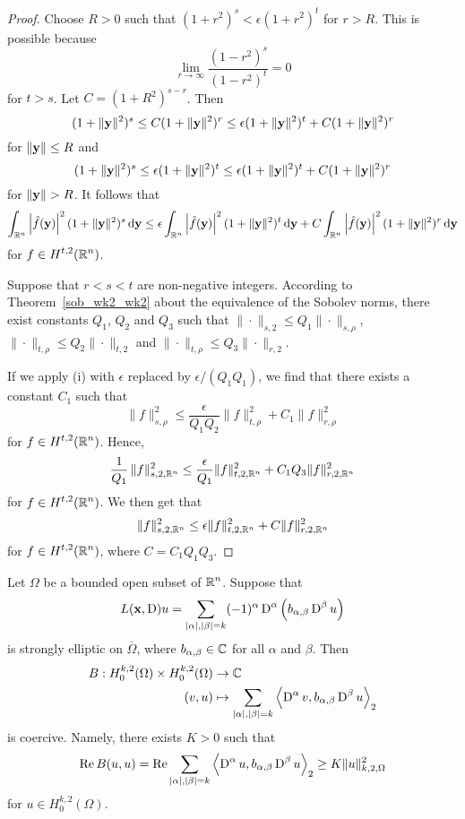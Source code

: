 \begin{proof}
 Choose $R>0$ such that $(1+r^2)^s < \epsilon (1+r^2)^t$ for $r> R$.
This is possible because
\[
\lim_{r\rightarrow \infty} \frac{(1-r^2)^s}{(1-r^2)^t} = 0
\]
for $t>s$.  Let $C= (1+R^2)^{s-r}$.  Then
\[
(1+\|\mathbf{y}\|^2)^s \leq C (1+\|\mathbf{y}\|^2)^r \leq
\epsilon (1+\|\mathbf{y}\|^2)^t + C (1+\|\mathbf{y}\|^2)^r
\]
for $\|\mathbf{y}\|\leq R$ and
\[
(1+\|\mathbf{y}\|^2)^s \leq \epsilon (1+\|\mathbf{y}\|^2)^t \leq
\epsilon (1+\|\mathbf{y}\|^2)^t + C (1+\|\mathbf{y}\|^2)^r
\]
for $\|\VEC{y}\|> R$.  It follows that
\[
\int_{\mathbb{R}^n} \left|\hat{f}(\mathbf{y})\right|^2 (1+\|\mathbf{y}\|^2)^s \,\mathrm{d}{\mathbf{y}}
\leq \epsilon \int_{\mathbb{R}^n} \left|\hat{f}(\mathbf{y})\right|^2
(1+\|\mathbf{y}\|^2)^t \,\mathrm{d}{\mathbf{y}}
+ C \int_{\mathbb{R}^n} \left|\hat{f}(\mathbf{y})\right|^2
(1+\|\mathbf{y}\|^2)^r \,\mathrm{d}{\mathbf{y}}
\]
for $\displaystyle f \in H^{t,2}(\mathbb{R}^n)$.

  Suppose that $r<s<t$ are non-negative integers.
According to Theorem~\ref{sob_wk2_wk2} about the equivalence of the
Sobolev norms, there exist constants $Q_1$, $Q_2$ and $Q_3$ such that
$\|\cdot\|_{s,2} \leq Q_1 \|\cdot\|_{s,\rho}$,
$\|\cdot\|_{t,\rho} \leq Q_2 \|\cdot\|_{t,2}$ and
$\|\cdot\|_{t,\rho} \leq Q_3 \|\cdot\|_{r,2}$.

If we apply (i) with $\epsilon$ replaced by $\epsilon/(Q_1 Q_1)$, we
find that there exists a constant $C_1$ such that
\[
\|f\|_{s,\rho}^2 \leq \frac{\epsilon}{Q_1 Q_2} \| f\|_{t,\rho}^2
+ C_1 \| f \|_{r,\rho}^2
\]
for $\displaystyle f \in H^{t,2}(\mathbb{R}^n)$.  Hence,
\[
\frac{1}{Q_1}\, \|f\|_{s,2,\mathbb{R}^n}^2 \leq \frac{\epsilon}{Q_1}
\| f\|_{t,2,\mathbb{R}^n}^2 + C_1 Q_3 \| f \|_{r,2,\mathbb{R}^n}^2
\]
for $\displaystyle f \in H^{t,2}(\mathbb{R}^n)$.  We then get that
\[
\|f\|_{s,2,\mathbb{R}^n}^2 \leq \epsilon \| f\|_{t,2,\mathbb{R}^n}^2 + C \| f \|_{r,2,\mathbb{R}^n}^2
\]
for $\displaystyle f \in H^{t,2}(\mathbb{R}^n)$, where $C= C_1 Q_1 Q_3$.
\end{proof}

\begin{lemma} \label{ell_garding2}
Let $\Omega$ be a bounded open subset of $\displaystyle \mathbb{R}^n$.  Suppose that
\[
L(\mathbf{x},\operatorname{D})u = \sum_{|\alpha|,|\beta|= k} (-1)^\alpha \operatorname{D}^\alpha
\left( b_{\alpha,\beta} \operatorname{D}^\beta u\right)
\]
is strongly elliptic on $\overline{\Omega}$, where
$b_{\alpha,\beta} \in \mathbb{C}$ for all $\alpha$ and $\beta$.  Then
\[
\begin{split}
B : H^{k,2}_0(\Omega) \times H^{k,2}_0(\Omega) & \rightarrow \mathbb{C} \\
(v,u) &\mapsto
\sum_{|\alpha|,|\beta|= k}
\left\langle{\operatorname{D}^\alpha v} , {b_{\alpha,\beta} \operatorname{D}^\beta u}\right\rangle_2
\end{split}
\]
is coercive.  Namely, there exists $K>0$ such that
\[
\operatorname{Re} B(u,u) = \operatorname{Re} \sum_{|\alpha|,|\beta|= k}
\left\langle{\operatorname{D}^\alpha u} , {b_{\alpha,\beta} \operatorname{D}^\beta u}\right\rangle_2 \geq K \|u\|_{k,2,\Omega}^2
\]
for $\displaystyle u  \in H^{k,2}_0(\Omega)$.
\end{lemma}

